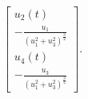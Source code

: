 \documentclass[../differential_methods.tex]{subfiles}
\begin{document}
\begin{example}[Gravitação]
\begin{align*}
\begin{bmatrix}
			                                                                                                              u_2(t)                                             \\
			                                                                                                              -\frac{u_{1}}{(u_{1}^{2}+u_{3}^{2})^{\frac{3}{2}}} \\
			                                                                                                              u_4(t)                                             \\
			                                                                                                              -\frac{u_{3}}{(u_{1}^{2}+u_{3}^{2})^{\frac{3}{2}}}
		                                                                                                              \end{bmatrix}.
	\end{align*}
\end{example}
\end{document}

